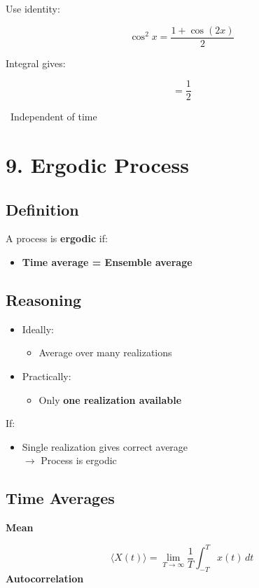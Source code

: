 \documentclass[12pt]{article}
\begin{document}
Use identity:

\[
\cos^2 x = \frac{1 + \cos(2x)}{2}
\]

Integral gives:

\[
= \frac{1}{2}
\]

\checkmark\ Independent of time

\section*{9. Ergodic Process}

\subsection*{Definition}

A process is \textbf{ergodic} if:

\begin{itemize}
\item \textbf{Time average = Ensemble average}
\end{itemize}

\subsection*{Reasoning}
\begin{itemize}
\item Ideally:
\begin{itemize}
\item Average over many realizations
\end{itemize}
\item Practically:
\begin{itemize}
\item Only \textbf{one realization available}
\end{itemize}
\end{itemize}

If:

\begin{itemize}
\item Single realization gives correct average\\
     $\rightarrow$ Process is ergodic
\end{itemize}

\subsection*{Time Averages}

\textbf{Mean}

\[
\langle X(t)\rangle = \lim_{T\to\infty}\frac{1}{T}\int_{-T}^{T}x(t)\,dt
\]
\textbf{Autocorrelation}
\end{document}
